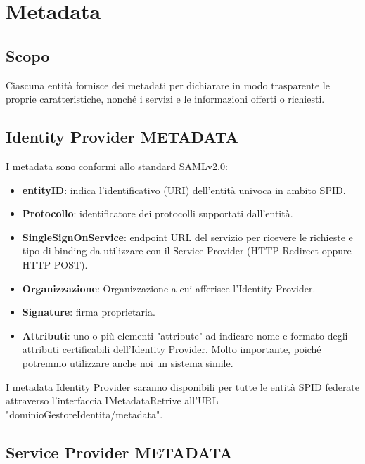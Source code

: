 \section{Metadata}
\subsection{Scopo}
Ciascuna entità fornisce dei metadati per dichiarare in modo trasparente le proprie caratteristiche, nonché i servizi e le 
informazioni offerti o richiesti.
\subsection{Identity Provider METADATA}
I metadata sono conformi allo standard SAMLv2.0:
\begin{itemize}
    \item \textbf{entityID}: indica l’identificativo (URI\glo) dell’entità univoca in ambito SPID.
    \item \textbf{Protocollo}: identificatore dei protocolli supportati dall'entità.
    \item \textbf{SingleSignOnService}: endpoint URL del servizio per ricevere le richieste e tipo di binding da utilizzare con il Service Provider (HTTP-Redirect oppure HTTP-POST).
    \item \textbf{Organizzazione}: Organizzazione a cui afferisce l'Identity Provider.
    \item \textbf{Signature}: firma proprietaria.
    \item \textbf{Attributi}: uno o più elementi "attribute" ad indicare nome e formato degli attributi certificabili dell’Identity Provider.
    Molto importante, poiché potremmo utilizzare anche noi un sistema simile.
\end{itemize}
I metadata Identity Provider saranno disponibili per tutte le entità SPID federate attraverso
l’interfaccia IMetadataRetrive all'URL "dominioGestoreIdentita/metadata".

\subsection{Service Provider METADATA}


